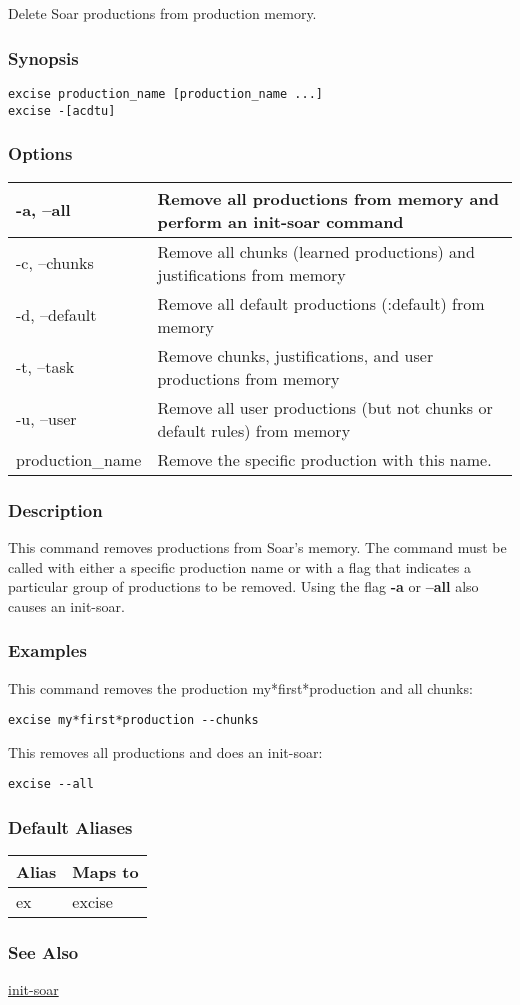\subsection{}
\label{excise}
Delete Soar productions from production memory. 
\subsubsection*{Synopsis}
\begin{verbatim}
excise production_name [production_name ...]
excise -[acdtu]
\end{verbatim}
\subsubsection*{Options}
\begin{tabular}{|l|l|}
\hline 
 -a, --all  & Remove all productions from memory and perform an init-soar command  \\
 \hline 
 -c, --chunks  & Remove all chunks (learned productions) and justifications from memory  \\
 \hline 
 -d, --default  & Remove all default productions (:default) from memory  \\
 \hline 
 -t, --task  & Remove chunks, justifications, and user productions from memory  \\
 \hline 
 -u, --user  & Remove all user productions (but not chunks or default rules) from memory  \\
 \hline 
production\_name & Remove the specific production with this name.  \\
 \hline 
\end{tabular}
\subsubsection*{Description}
 This command removes productions from Soar's memory. The command must be called with either a specific production name or with a flag that indicates a particular group of productions to be removed. Using the flag \textbf{-a}
 or \textbf{--all}
 also causes an init-soar. 
\subsubsection*{Examples}
 This command removes the production my*first*production and all chunks: \begin{verbatim}
excise my*first*production --chunks
\end{verbatim}
 This removes all productions and does an init-soar: \begin{verbatim}
excise --all
\end{verbatim}
\subsubsection*{Default Aliases}
\begin{tabular}{|l|l|}
\hline 
 Alias  & Maps to  \\
 \hline 
 ex  & excise  \\
 \hline 
\end{tabular}
\subsubsection*{See Also}
\hyperref[init-soar]{init-soar} 